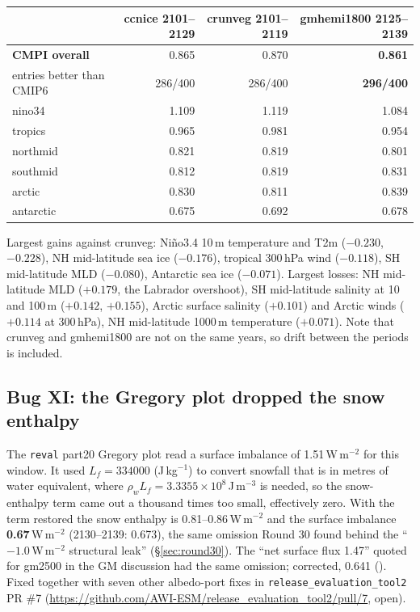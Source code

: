\documentclass[10pt]{article}
\begin{document}
\begin{center}\small
\begin{tabular}{lrrr}
\toprule
 & ccnice 2101--2129 & crunveg 2101--2119 & \textbf{gmhemi1800 2125--2139} \\
\midrule
\textbf{CMPI overall}       & 0.865 & 0.870 & \textbf{0.861} \\
entries better than CMIP6   & 286/400 & 286/400 & \textbf{296/400} \\
\midrule
nino34    & 1.109 & 1.119 & 1.084 \\
tropics   & 0.965 & 0.981 & 0.954 \\
northmid  & 0.821 & 0.819 & 0.801 \\
southmid  & 0.812 & 0.819 & 0.831 \\
arctic    & 0.830 & 0.811 & 0.839 \\
antarctic & 0.675 & 0.692 & 0.678 \\
\bottomrule
\end{tabular}
\end{center}

Largest gains against crunveg: Ni\~no3.4 10\,m temperature and T2m ($-0.230$, $-0.228$), NH
mid-latitude sea ice ($-0.176$), tropical 300\,hPa wind ($-0.118$), SH mid-latitude MLD
($-0.080$), Antarctic sea ice ($-0.071$). Largest losses: NH mid-latitude MLD ($+0.179$, the
Labrador overshoot), SH mid-latitude salinity at 10 and 100\,m ($+0.142$, $+0.155$), Arctic
surface salinity ($+0.101$) and Arctic winds ($+0.114$ at 300\,hPa), NH mid-latitude 1000\,m
temperature ($+0.071$). Note that crunveg and gmhemi1800 are not on the same years, so drift
between the periods is included.

\subsection{Bug XI: the Gregory plot dropped the snow enthalpy}\label{sub:r44gregory}

The \texttt{reval} part20 Gregory plot read a surface imbalance of 1.51\,W\,m$^{-2}$ for this
window. It used $L_f=334000$ (J\,kg$^{-1}$) to convert snowfall that is in metres of water
equivalent, where $\rho_w L_f=3.3355\times10^8$\,J\,m$^{-3}$ is needed, so the snow-enthalpy term
came out a thousand times too small, effectively zero. With the term restored the snow enthalpy is
0.81--0.86\,W\,m$^{-2}$ and the surface imbalance \textbf{0.67}\,W\,m$^{-2}$ (2130--2139: 0.673),
the same omission Round 30 found behind the ``$-1.0$\,W\,m$^{-2}$ structural leak''
(\S\ref{sec:round30}). The ``net surface flux 1.47'' quoted for gm2500 in the GM discussion had
the same omission; corrected, 0.641 (). Fixed together
with seven other albedo-port fixes in \texttt{release\_evaluation\_tool2} PR \#7
(\url{https://github.com/AWI-ESM/release_evaluation_tool2/pull/7}, open).
\end{document}
